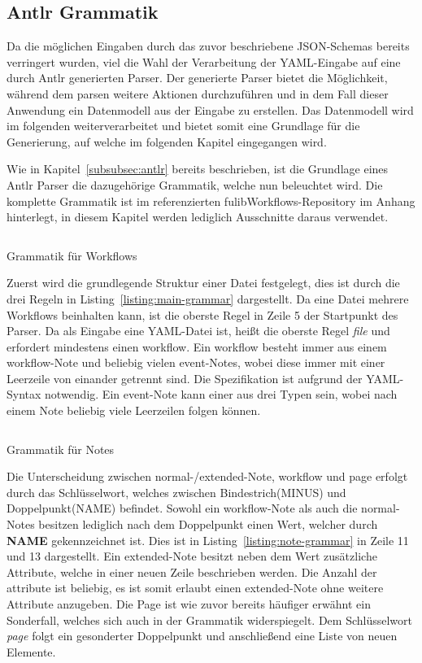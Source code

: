 \subsection{Antlr Grammatik}\label{subsec:antlr-grammatik}
Da die möglichen Eingaben durch das zuvor beschriebene JSON-Schemas bereits verringert wurden, viel die Wahl der Verarbeitung der YAML-Eingabe auf eine durch Antlr generierten Parser.
Der generierte Parser bietet die Möglichkeit, während dem parsen weitere Aktionen durchzuführen und in dem Fall dieser Anwendung ein Datenmodell aus der Eingabe zu erstellen.
Das Datenmodell wird im folgenden weiterverarbeitet und bietet somit eine Grundlage für die Generierung, auf welche im folgenden Kapitel eingegangen wird.

Wie in Kapitel~\ref{subsubsec:antlr} bereits beschrieben, ist die Grundlage eines Antlr Parser die dazugehörige Grammatik, welche nun beleuchtet wird.
Die komplette Grammatik ist im referenzierten fulibWorkflows-Repository im Anhang hinterlegt, in diesem Kapitel werden lediglich Ausschnitte daraus verwendet.

\begin{listing}[!ht]
    \inputminted[xleftmargin=20pt,linenos,firstnumber=5]{antlr-java}{listings/3.1.3/Main.g4}
    \caption{Grammatik für Workflows}
    \label{listing:main-grammar}
\end{listing}

Zuerst wird die grundlegende Struktur einer Datei festgelegt, dies ist durch die drei Regeln in Listing~\ref{listing:main-grammar} dargestellt.
Da eine Datei mehrere Workflows beinhalten kann, ist die oberste Regel in Zeile 5 der Startpunkt des Parser.
Da als Eingabe eine YAML-Datei ist, heißt die oberste Regel \textit{file} und erfordert mindestens einen workflow.
Ein workflow besteht immer aus einem workflow-Note und beliebig vielen event-Notes, wobei diese immer mit einer Leerzeile von einander getrennt sind.
Die Spezifikation ist aufgrund der YAML-Syntax notwendig.
Ein event-Note kann einer aus drei Typen sein, wobei nach einem Note beliebig viele Leerzeilen folgen können.

\begin{listing}[!ht]
    \inputminted[xleftmargin=20pt,linenos,firstnumber=11]{antlr-java}{listings/3.1.3/Note.g4}
    \caption{Grammatik für Notes}
    \label{listing:note-grammar}
\end{listing}

Die Unterscheidung zwischen normal-/extended-Note, workflow und page erfolgt durch das Schlüsselwort, welches zwischen Bindestrich(MINUS) und Doppelpunkt(NAME) befindet.
Sowohl ein workflow-Note als auch die normal-Notes besitzen lediglich nach dem Doppelpunkt einen Wert, welcher durch \textbf{NAME} gekennzeichnet ist.
Dies ist in Listing~\ref{listing:note-grammar} in Zeile 11 und 13 dargestellt.
Ein extended-Note besitzt neben dem Wert zusätzliche Attribute, welche in einer neuen Zeile beschrieben werden.
Die Anzahl der attribute ist beliebig, es ist somit erlaubt einen extended-Note ohne weitere Attribute anzugeben.
Die Page ist wie zuvor bereits häufiger erwähnt ein Sonderfall, welches sich auch in der Grammatik widerspiegelt.
Dem Schlüsselwort \textit{page} folgt ein gesonderter Doppelpunkt und anschließend eine Liste von neuen Elemente.

